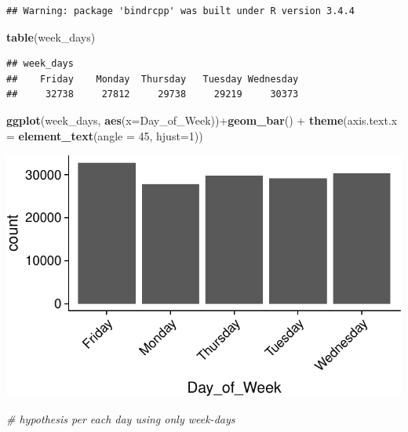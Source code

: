 \documentclass[]{article}
\newenvironment{Shaded}{\begin{snugshade}}{\end{snugshade}}
\newcommand{\KeywordTok}[1]{\textcolor[rgb]{0.13,0.29,0.53}{\textbf{{#1}}}}
\newcommand{\DataTypeTok}[1]{\textcolor[rgb]{0.13,0.29,0.53}{{#1}}}
\newcommand{\DecValTok}[1]{\textcolor[rgb]{0.00,0.00,0.81}{{#1}}}
\newcommand{\StringTok}[1]{\textcolor[rgb]{0.31,0.60,0.02}{{#1}}}
\newcommand{\CommentTok}[1]{\textcolor[rgb]{0.56,0.35,0.01}{\textit{{#1}}}}
\newcommand{\NormalTok}[1]{{#1}}
\begin{document}
\begin{verbatim}
## Warning: package 'bindrcpp' was built under R version 3.4.4
\end{verbatim}

\begin{Shaded}
\begin{Highlighting}[]
\KeywordTok{table}\NormalTok{(week_days)}
\end{Highlighting}
\end{Shaded}

\begin{verbatim}
## week_days
##    Friday    Monday  Thursday   Tuesday Wednesday 
##     32738     27812     29738     29219     30373
\end{verbatim}

\begin{Shaded}
\begin{Highlighting}[]
\KeywordTok{ggplot}\NormalTok{(week_days, }\KeywordTok{aes}\NormalTok{(}\DataTypeTok{x=}\NormalTok{Day_of_Week))+}\KeywordTok{geom_bar}\NormalTok{() +}
\StringTok{  }\KeywordTok{theme}\NormalTok{(}\DataTypeTok{axis.text.x =} \KeywordTok{element_text}\NormalTok{(}\DataTypeTok{angle =} \DecValTok{45}\NormalTok{, }\DataTypeTok{hjust=}\DecValTok{1}\NormalTok{)) }
\end{Highlighting}
\end{Shaded}

\includegraphics{README_files/figure-latex/unnamed-chunk-11-1.pdf}

\begin{Shaded}
\begin{Highlighting}[]
\CommentTok{# hypothesis per each day using only week-days}
\end{Highlighting}
\end{Shaded}
\end{document}
